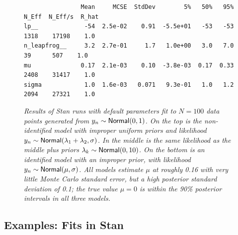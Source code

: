\begin{figure}
\begin{Verbatim}
                Mean     MCSE  StdDev        5%   50%   95%  N_Eff  N_Eff/s  R_hat
lp__             -54  2.5e-02    0.91  -5.5e+01   -53   -53   1318    17198    1.0
n_leapfrog__     3.2  2.7e-01     1.7   1.0e+00   3.0   7.0     39      507    1.0
mu              0.17  2.1e-03    0.10  -3.8e-03  0.17  0.33   2408    31417    1.0
sigma            1.0  1.6e-03   0.071   9.3e-01   1.0   1.2   2094    27321    1.0
\end{Verbatim}
%
\caption{\small\it Results of Stan runs with default parameters fit to
  $N=100$ data points generated from $y_n \sim \distro{Normal}(0,1)$.
  On the top is the non-identified model with improper uniform priors
  and likelihood $y_n \sim \distro{Normal}(\lambda_1 + \lambda_2,
  \sigma)$. 
  In the middle is the same likelihood as the middle plus priors
  $\lambda_k \sim \distro{Normal}(0,10)$. 
  On the bottom is an identified model with an improper prior, with
  likelihood  $y_n \sim \distro{Normal}(\mu,\sigma)$.  All models
  estimate $\mu$ at roughly 0.16 with very little Monte Carlo standard
  error, but a high posterior standard deviation of 0.1;  the true
  value $\mu=0$ is within the 90\% posterior intervals in all three models.
}%
\label{non-identified-stan-fits.figure}
\end{figure}
%

\subsection{Examples: Fits in Stan}

